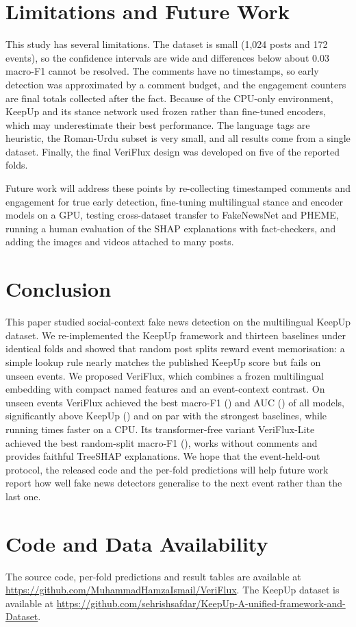 \documentclass[conference]{IEEEtran}
\begin{document}
\section{Limitations and Future Work}
\label{sec:limits}
This study has several limitations. The dataset is small (1,024 posts and 172 events), so the confidence intervals
are wide and differences below about 0.03 macro-F1 cannot be resolved. The comments have no timestamps, so early
detection was approximated by a comment budget, and the engagement counters are final totals collected after the
fact. Because of the CPU-only environment, KeepUp and its stance network used frozen rather than fine-tuned
encoders, which may underestimate their best performance. The language tags are heuristic, the Roman-Urdu subset
is very small, and all results come from a single dataset. Finally, the final VeriFlux design was developed on
five of the reported folds.

Future work will address these points by re-collecting timestamped comments and engagement for true early
detection, fine-tuning multilingual stance and encoder models on a GPU, testing cross-dataset transfer to
FakeNewsNet and PHEME, running a human evaluation of the SHAP explanations with fact-checkers, and adding the images
and videos attached to many posts.

\section{Conclusion}
\label{sec:conclusion}
This paper studied social-context fake news detection on the multilingual KeepUp dataset. We re-implemented the
KeepUp framework and thirteen baselines under identical folds and showed that random post splits reward event
memorisation: a simple lookup rule nearly matches the published KeepUp score but fails on unseen events. We
proposed VeriFlux, which combines a frozen multilingual embedding with compact named features and an event-context
contrast. On unseen events VeriFlux achieved the best macro-F1 (\VFeventFone{}) and AUC (\VFeventAuc{}) of all
models, significantly above KeepUp (\KUeventFone{}) and on par with the strongest baselines, while running
\LatencyRatio{} times faster on a CPU. Its transformer-free variant VeriFlux-Lite achieved the best random-split
macro-F1 (\VFLrandomFone{}), works without comments and provides faithful TreeSHAP explanations. We hope that the
event-held-out protocol, the released code and the per-fold predictions will help future work report how well fake
news detectors generalise to the next event rather than the last one.

\section*{Code and Data Availability}
The source code, per-fold predictions and result tables are available at
\url{https://github.com/MuhammadHamzaIsmail/VeriFlux}. The
KeepUp dataset is available at
\url{https://github.com/sehrishsafdar/KeepUp-A-unified-framework-and-Dataset}.



\end{document}
